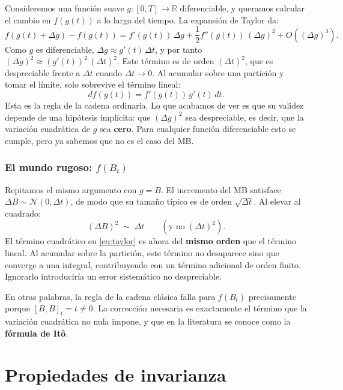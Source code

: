 \documentclass[12pt]{book}
\begin{document}
Consideremos una función suave $g:[0,T]\to\mathbb{R}$ diferenciable, y queramos calcular el cambio en $f(g(t))$ a lo largo del tiempo. La expansión de Taylor da:
\begin{equation}
    f(g(t) + \Delta g) - f(g(t)) = f'(g(t))\,\Delta g + \frac{1}{2}f''(g(t))\,(\Delta g)^2 + O((\Delta g)^3).
    \label{eq:taylor}
\end{equation}
Como $g$ es diferenciable, $\Delta g \approx g'(t)\,\Delta t$, y por tanto $(\Delta g)^2 \approx (g'(t))^2\,(\Delta t)^2$. Este término es de orden $(\Delta t)^2$, que es despreciable frente a $\Delta t$ cuando $\Delta t \to 0$. Al acumular sobre una partición y tomar el límite, solo sobrevive el término lineal:
\[
    df(g(t)) = f'(g(t))\,g'(t)\,dt.
\]
Esta es la regla de la cadena ordinaria. Lo que acabamos de ver es que su validez depende de una hipótesis implícita: que $(\Delta g)^2$ sea despreciable, es decir, que la variación cuadrática de $g$ sea \textbf{cero}. Para cualquier función diferenciable esto se cumple, pero ya sabemos que no es el caso del MB.

\subsubsection*{El mundo rugoso: $f(B_t)$}

Repitamos el mismo argumento con $g = B$. El incremento del MB satisface $\Delta B \sim \mathcal{N}(0,\Delta t)$, de modo que su tamaño típico es de orden $\sqrt{\Delta t}$. Al elevar al cuadrado:
\[
    (\Delta B)^2 \;\sim\; \Delta t \qquad (\text{y no } (\Delta t)^2).
\]
El término cuadrático en \eqref{eq:taylor} es ahora del \textbf{mismo orden} que el término lineal. Al acumular sobre la partición, este término no desaparece sino que converge a una integral, contribuyendo con un término adicional de orden finito. Ignorarlo introduciría un error sistemático no despreciable.

En otras palabras, la regla de la cadena clásica falla para $f(B_t)$ precisamente porque $[B,B]_t = t \neq 0$. La corrección necesaria es exactamente el término que la variación cuadrática no nula impone, y que en la literatura se conoce como la \textbf{fórmula de It\^{o}}.%
\section{Propiedades de invarianza}
\end{document}
